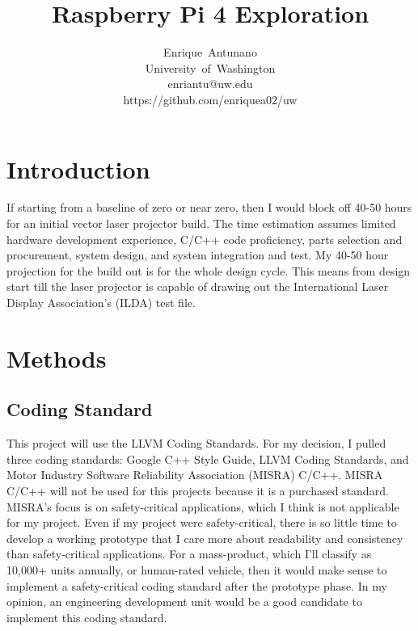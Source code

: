 \documentclass[journal]{IEEEtran}
\begin{document}
    \title{Raspberry Pi 4 Exploration}

    \author{Enrique~Antunano\\University~of~Washington\\enriantu@uw.edu\\https://github.com/enriquea02/uw}


    \maketitle

    \begin{abstract}

    \end{abstract}
    \section{Introduction}
    If starting from a baseline of zero or near zero, then I would block off 40-50 hours for an initial vector laser projector build. 
    The time estimation assumes limited hardware development experience, C/C++ code proficiency, parts selection and procurement, system design, and system integration and test.
    My 40-50 hour projection for the build out is for the whole design cycle. 
    This means from design start till the laser projector is capable of drawing out the International Laser Display Association's (ILDA) test file.

    \section{Methods}
    \subsection {Coding Standard}
    This project will use the LLVM Coding Standards. 
    For my decision, I pulled three coding standards: Google C++ Style Guide, LLVM Coding Standards, and Motor Industry Software Reliability Association (MISRA) C/C++.
    MISRA C/C++ will not be used for this projects because it is a purchased standard.
    MISRA's focus is on safety-critical applications, which I think is not applicable for my project.
    Even if my project were safety-critical, there is so little time to develop a working prototype that I care more about readability and consistency than safety-critical applications.
    For a mass-product, which I'll classify as 10,000+ units annually, or human-rated vehicle, then it would make sense to implement a safety-critical coding standard after the prototype phase.
    In my opinion, an engineering development unit would be a good candidate to implement this coding standard.
\end{document}
